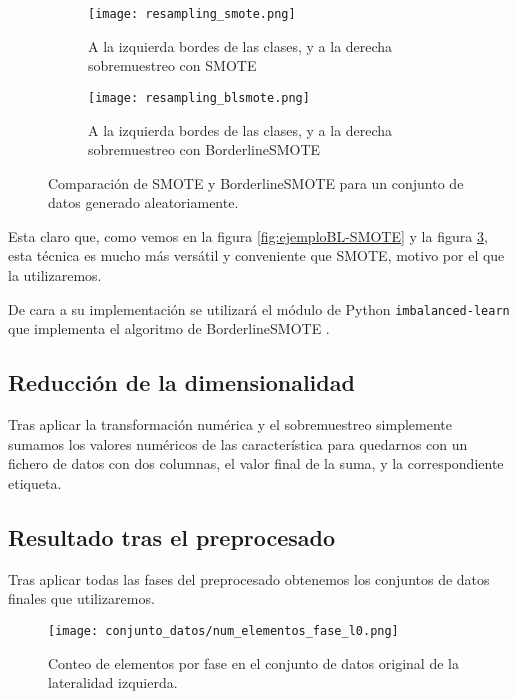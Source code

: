 \begin{figure}[H]
    \centering
	 \begin{subfigure}[b]{\textwidth}
		 \centering
		 \texttt{[image: resampling\_smote.png]}
		 \caption{A la izquierda bordes de las clases, y a la derecha sobremuestreo con SMOTE}
		 \label{fig:SMOTE-cmp}
	 \end{subfigure}

    \begin{subfigure}[b]{\textwidth}
		 \centering
		  \texttt{[image: resampling\_blsmote.png]}
        \caption{A la izquierda bordes de las clases, y a la derecha sobremuestreo con BorderlineSMOTE}
        \label{fig:BLSMOTE-cmp}
    \end{subfigure}

    \caption{Comparación de SMOTE y BorderlineSMOTE para un conjunto de datos generado aleatoriamente.}\label{fig:BLSMOTE-SMOTE}

\end{figure}

Esta claro que, como vemos en la figura \ref{fig:ejemploBL-SMOTE} y la figura \ref{fig:BLSMOTE-SMOTE}, esta técnica es mucho más versátil y conveniente que SMOTE, motivo por el que la utilizaremos.


De cara a su implementación se utilizará el módulo de Python \texttt{imbalanced-learn} que implementa el algoritmo de BorderlineSMOTE \cite{imblearnBLSMOTE}.


\subsection{Reducción de la dimensionalidad}

Tras aplicar la transformación numérica y el sobremuestreo simplemente sumamos los valores numéricos de las característica para quedarnos con un fichero de datos con dos columnas, el valor final de la suma, y la correspondiente etiqueta.

\newpage

\subsection{Resultado tras el preprocesado}

Tras aplicar todas las fases del preprocesado obtenemos los conjuntos de datos finales que utilizaremos.

\begin{figure}[H]
    \centering
	  \texttt{[image: conjunto\_datos/num\_elementos\_fase\_l0.png]}
     \label{fig:l0-orig}
    \caption{Conteo de elementos por fase en el conjunto de datos original de la lateralidad izquierda.}

\end{figure}

